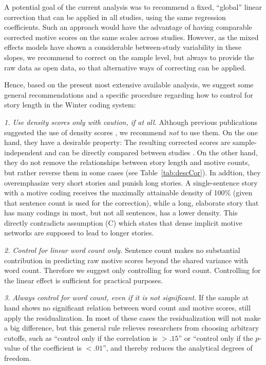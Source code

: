 \documentclass[man,a4paper,mask]{apa6}\usepackage[]{graphicx}\usepackage[]{color}
\begin{document}
A potential goal of the current analysis was to recommend a fixed, ``global'' linear correction that can be applied in all studies, using the same regression coefficients. Such an approach would have the advantage of having comparable corrected motive scores on the same scales across studies. However, as the mixed effects models have shown a considerable between-study variability in these slopes, we recommend to correct on the sample level, but always to provide the raw data as open data, so that alternative ways of correcting can be applied.

Hence, based on the present most extensive available analysis, we suggest some general recommendations and a specific procedure regarding how to control for story length in the Winter coding system:

\emph{1. Use density scores only with caution, if at all.} Although previous publications suggested the use of density scores \parencite[e.g., ][]{winter_MeasuringPersonalityDistance_1991}, we recommend \emph{not} to use them. On the one hand, they have a desirable property: The resulting corrected scores are sample-independent and can be directly compared between studies \parencite{schultheiss_MeasuringImplicitMotives_2007}. On the other hand, they do not remove the relationships between story length and motive counts, but rather reverse them in some cases (see Table~\ref{tab:descCor}). In addtion, they overemphasize very short stories and punish long stories. A single-sentence story with a motive coding receives the maximally attainable density of 100\% (given that sentence count is used for the correction), while a long, elaborate story that has many codings in most, but not all sentences, has a lower density. This directly contradicts assumption (C) which states that dense implicit motive networks are supposed to lead to longer stories.

\emph{2. Control for linear word count only.} Sentence count makes no substantial contribution in predicting raw motive scores beyond the shared variance with word count. Therefore we suggest only controlling for word count. Controlling for the linear effect is sufficient for practical purposes.

\emph{3. Always control for word count, even if it is not significant.} If the sample at hand shows no significant relation between word count and motive scores, still apply the residualization. In most of these cases the residualization will not make a big difference, but this general rule relieves researchers from choosing arbitrary cutoffs, such as ``control only if the correlation is $> .15$'' or ``control only if the $p$-value of the coefficient is $<.01$'', and thereby reduces the analytical degrees of freedom.
\end{document}
